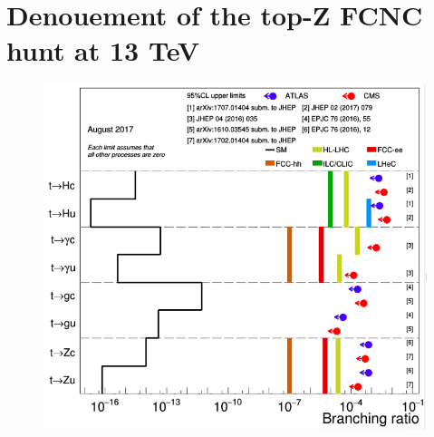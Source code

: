 \chapter{Denouement of the top-Z FCNC hunt at 13 TeV}
\begin{figure}
	\centering
	\includegraphics[width=0.7\linewidth]{Future}
	\caption{}
	\label{fig:future}
\end{figure}



